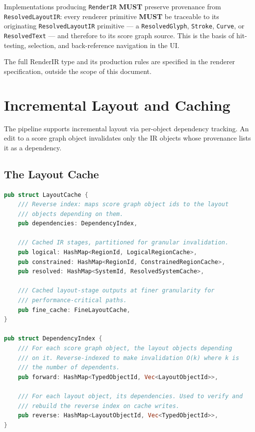 \documentclass[11pt,letterpaper]{report}
\newcounter{requirement}[chapter]
\newcommand{\MUST}{\textbf{MUST}}
\begin{document}
\begin{requirement}
  \label{req:layoutir:render-provenance}
  Implementations producing \texttt{RenderIR} \MUST{} preserve
  provenance from \texttt{ResolvedLayoutIR}: every renderer primitive
  \MUST{} be traceable to its originating \texttt{ResolvedLayoutIR}
  primitive --- a \texttt{ResolvedGlyph}, \texttt{Stroke},
  \texttt{Curve}, or \texttt{ResolvedText} --- and therefore to its
  score graph source. This is
  the basis of hit-testing, selection, and back-reference navigation
  in the UI.

  The full RenderIR type and its production rules are specified in
  the renderer specification, outside the scope of this document.
\end{requirement}

\section{Incremental Layout and Caching}
\label{sec:layoutir:incremental}

The pipeline supports incremental layout via per-object dependency
tracking. An edit to a score graph object invalidates only the IR
objects whose provenance lists it as a dependency.

\subsection{The Layout Cache}

\begin{lstlisting}[language=Rust]
pub struct LayoutCache {
    /// Reverse index: maps score graph object ids to the layout
    /// objects depending on them.
    pub dependencies: DependencyIndex,

    /// Cached IR stages, partitioned for granular invalidation.
    pub logical: HashMap<RegionId, LogicalRegionCache>,
    pub constrained: HashMap<RegionId, ConstrainedRegionCache>,
    pub resolved: HashMap<SystemId, ResolvedSystemCache>,

    /// Cached layout-stage outputs at finer granularity for
    /// performance-critical paths.
    pub fine_cache: FineLayoutCache,
}

pub struct DependencyIndex {
    /// For each score graph object, the layout objects depending
    /// on it. Reverse-indexed to make invalidation O(k) where k is
    /// the number of dependents.
    pub forward: HashMap<TypedObjectId, Vec<LayoutObjectId>>,

    /// For each layout object, its dependencies. Used to verify and
    /// rebuild the reverse index on cache writes.
    pub reverse: HashMap<LayoutObjectId, Vec<TypedObjectId>>,
}
\end{lstlisting}
\end{document}
